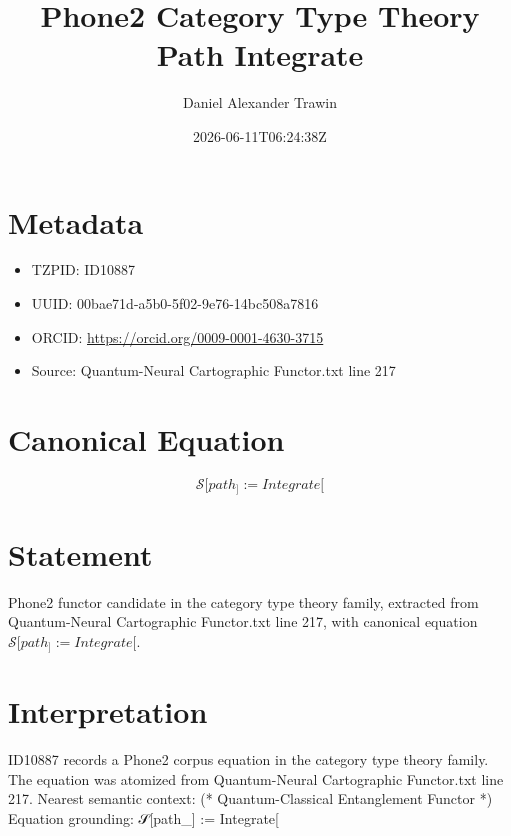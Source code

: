 \documentclass[11pt]{article}
\title{Phone2 Category Type Theory Path Integrate}
\author{Daniel Alexander Trawin}
\date{2026-06-11T06:24:38Z}
\begin{document}
\maketitle
\section*{Metadata}
\begin{itemize}
\item TZPID: ID10887
\item UUID: 00bae71d-a5b0-5f02-9e76-14bc508a7816
\item ORCID: \url{https://orcid.org/0009-0001-4630-3715}
\item Source: Quantum-Neural Cartographic Functor.txt line 217
\end{itemize}
\section*{Canonical Equation}
\[
𝒮[path_] := Integrate[
\]
\section*{Statement}
Phone2 functor candidate in the category type theory family, extracted from Quantum-Neural Cartographic Functor.txt line 217, with canonical equation $𝒮[path_] := Integrate[$.
\section*{Interpretation}
ID10887 records a Phone2 corpus equation in the category type theory family. The equation was atomized from Quantum-Neural Cartographic Functor.txt line 217. Nearest semantic context: (* Quantum-Classical Entanglement Functor *) Equation grounding: 𝒮[path_] := Integrate[
\end{document}
